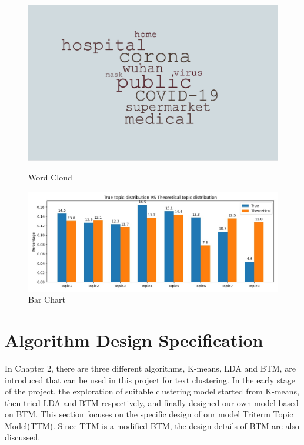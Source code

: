 \begin{figure}[H]
    \begin{minipage}[t]{0.4\linewidth}
        \centering
        \includegraphics[scale=0.2]{images/visualization_exp1.png}
        \caption{Word Cloud}
        \label{fig:2}
    \end{minipage}%
    \begin{minipage}[t]{0.5\linewidth}
        \centering
        \includegraphics[scale=0.3]{images/visualization_exp2.jpg}
        \caption{Bar Chart}
        \label{fig:3}
    \end{minipage}
\end{figure}

\section{Algorithm Design Specification}\label{model_design}
In Chapter 2, there are three different algorithms, K-means, LDA and BTM, are introduced that can be used in this project for text clustering. In the early stage of the project, the exploration of suitable clustering model started from K-means, then tried LDA and BTM respectively, and finally designed our own model based on BTM. This section focuses on the specific design of our model Triterm Topic Model(TTM). Since TTM is a modified BTM, the design details of BTM are also discussed.

